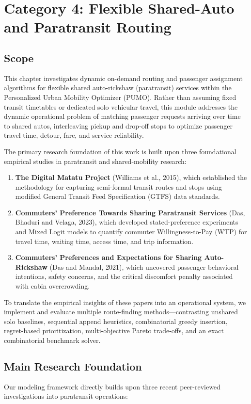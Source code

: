 \chapter{Category 4: Flexible Shared-Auto and Paratransit Routing}

\section{Scope}
This chapter investigates dynamic on-demand routing and passenger assignment algorithms for flexible shared auto-rickshaw (paratransit) services within the Personalized Urban Mobility Optimizer (PUMO). Rather than assuming fixed transit timetables or dedicated solo vehicular travel, this module addresses the dynamic operational problem of matching passenger requests arriving over time to shared autos, interleaving pickup and drop-off stops to optimize passenger travel time, detour, fare, and service reliability.

The primary research foundation of this work is built upon three foundational empirical studies in paratransit and shared-mobility research:
\begin{enumerate}
\item \textbf{The Digital Matatu Project} (Williams et al., 2015), which established the methodology for capturing semi-formal transit routes and stops using modified General Transit Feed Specification (GTFS) data standards.
\item \textbf{Commuters' Preference Towards Sharing Paratransit Services} (Das, Bhaduri and Velaga, 2023), which developed stated-preference experiments and Mixed Logit models to quantify commuter Willingness-to-Pay (WTP) for travel time, waiting time, access time, and trip information.
\item \textbf{Commuters' Preferences and Expectations for Sharing Auto-Rickshaw} (Das and Mandal, 2021), which uncovered passenger behavioral intentions, safety concerns, and the critical discomfort penalty associated with cabin overcrowding.
\end{enumerate}

To translate the empirical insights of these papers into an operational system, we implement and evaluate multiple route-finding methods—contrasting unshared solo baselines, sequential append heuristics, combinatorial greedy insertion, regret-based prioritization, multi-objective Pareto trade-offs, and an exact combinatorial benchmark solver.

\section{Main Research Foundation}
Our modeling framework directly builds upon three recent peer-reviewed investigations into paratransit operations:

